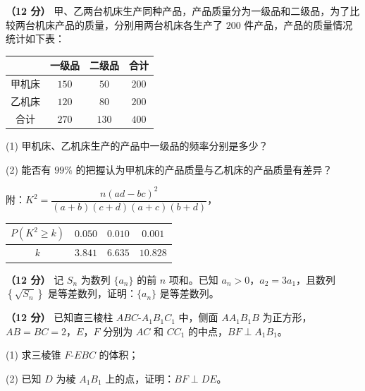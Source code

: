 
\begin{question}
\textbf{（12 分）} 甲、乙两台机床生产同种产品，产品质量分为一级品和二级品，为了比较两台机床产品的质量，分别用两台机床各生产了 $200$ 件产品，产品的质量情况统计如下表：

\begin{center}
\begin{tabular}{cccc}
\toprule
 & 一级品 & 二级品 & 合计 \\
\midrule
甲机床 & $150$ & $50$ & $200$ \\
乙机床 & $120$ & $80$ & $200$ \\
合计 & $270$ & $130$ & $400$ \\
\bottomrule
\end{tabular}
\end{center}

  (1) 甲机床、乙机床生产的产品中一级品的频率分别是多少？

  (2) 能否有 $99\%$ 的把握认为甲机床的产品质量与乙机床的产品质量有差异？

  附：$K^{2}=\dfrac{n(ad-bc)^{2}}{(a+b)(c+d)(a+c)(b+d)}$，

\begin{center}
\begin{tabular}{cccc}
\toprule
$P(K^{2}\geqslant k)$ & $0.050$ & $0.010$ & $0.001$ \\
\midrule
$k$ & $3.841$ & $6.635$ & $10.828$ \\
\bottomrule
\end{tabular}
\end{center}

\end{question}
\begin{question}
\textbf{（12 分）} 记 $S_n$ 为数列 $\{a_n\}$ 的前 $n$ 项和。已知 $a_n>0$，$a_2=3a_1$，且数列 $\left\{\sqrt{S_n}\right\}$ 是等差数列，证明：$\{a_n\}$ 是等差数列。

\Needspace{0.4\textheight}
\end{question}
\begin{question}
\textbf{（12 分）} 已知直三棱柱 $ABC\text{-}A_1B_1C_1$ 中，侧面 $AA_1B_1B$ 为正方形，$AB=BC=2$，$E$，$F$ 分别为 $AC$ 和 $CC_1$ 的中点，$BF\perp A_1B_1$。
\nopagebreak[4]
\begin{center}\end{center}
\nopagebreak[4]
  (1) 求三棱锥 $F\text{-}EBC$ 的体积；

  (2) 已知 $D$ 为棱 $A_1B_1$ 上的点，证明：$BF\perp DE$。

\end{question}
